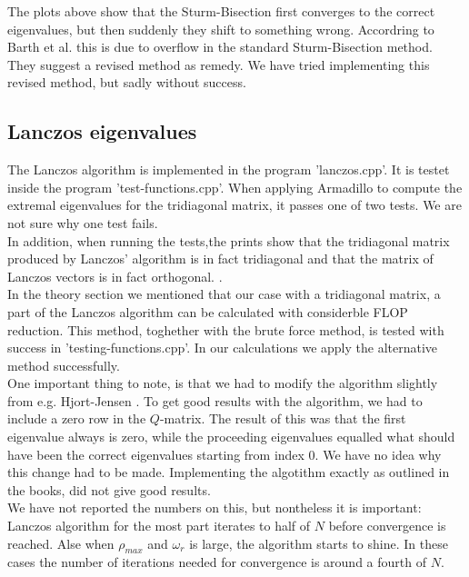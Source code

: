 \documentclass{article}
\begin{document}
The plots above show that the Sturm-Bisection first converges to the correct eigenvalues, but then suddenly they shift to something wrong. Accordring to Barth et al. \cite{barth} this is due to overflow in the standard Sturm-Bisection method. They suggest a revised method as remedy. We have tried implementing this revised method, but sadly without success.

\subsection{Lanczos eigenvalues}
The Lanczos algorithm is implemented in the program 'lanczos.cpp'. It is testet inside the program 'test-functions.cpp'. When applying Armadillo to compute the extremal eigenvalues for the tridiagonal matrix, it passes one of two tests. We are not sure why one test fails. \\

In addition, when running the tests,the prints show that the tridiagonal matrix produced by Lanczos' algorithm is in fact tridiagonal and that the matrix of Lanczos vectors is in fact orthogonal. .\\

In the theory section we mentioned that our case with a tridiagonal matrix, a part of the Lanczos algorithm can be calculated with considerble FLOP reduction. This method, toghether with the brute force method, is tested with success in 'testing-functions.cpp'. In our calculations we apply the alternative method successfully. \\

One important thing to note, is that we had to modify the algorithm slightly from e.g. Hjort-Jensen \cite{MHJ}. To get good results with the algorithm, we had to include a zero row in the $Q$-matrix. The result of this was that the first eigenvalue always is zero, while the proceeding eigenvalues equalled what should have been the correct eigenvalues starting from index 0. We have no idea why this change had to be made. Implementing the algotithm exactly as outlined in the books, did not give good results.\\

We have not reported the numbers on this, but nontheless it is important: Lanczos algorithm for the most part iterates to half of $N$ before convergence is reached. Alse when $\rho_{max}$ and $\omega_r$ is large, the algorithm starts to shine. In these cases the number of iterations needed for convergence is around a fourth of $N$.\\
\end{document}
